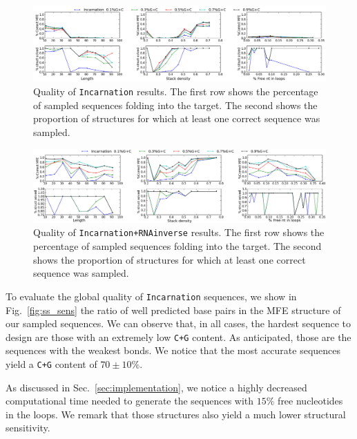 \begin{figure}[ht!]	
	\centering
	\includegraphics[scale=0.45]{Figures/mfe_struct_solve_nornainverse.png}
	\caption{Quality of \texttt{Incarnation} results. The first row shows the percentage
	of sampled sequences folding into the target. The second shows the 	
	proportion	of structures for which at least one correct sequence was 
	sampled.}
	\label{fig:mfe_struct_solved_noinverse}	
\end{figure}



\begin{figure}[ht!]	
	\centering
	\includegraphics[scale=0.45]{Figures/mfe_struct_solved}
	\caption{Quality of \texttt{Incarnation+RNAinverse} results. The first row shows the percentage
	of sampled sequences folding into the target. The second shows the 	
	proportion	of structures for which at least one correct sequence was 
	sampled.}
	\label{fig:mfe_struct_solved}	
\end{figure}
 
To evaluate the global quality of \texttt{Incarnation} sequences, we show
in Fig.~\ref{fig:ss_sens} the ratio of well predicted base pairs in the
MFE structure of our sampled sequences. We can observe that, in all cases,
the hardest sequence to design are those with an extremely low \texttt{C+G}
content. As anticipated, those are the sequences with the weakest bonds.
We notice that the most accurate sequences yield a \texttt{C+G} content
of $70\pm 10\%$. 

As discussed in Sec.~\ref{sec:implementation}, we notice a highly decreased
computational time needed to generate the sequences with $15\%$ free 
nucleotides in the loops. We remark that those structures also yield 
a much lower structural sensitivity.

